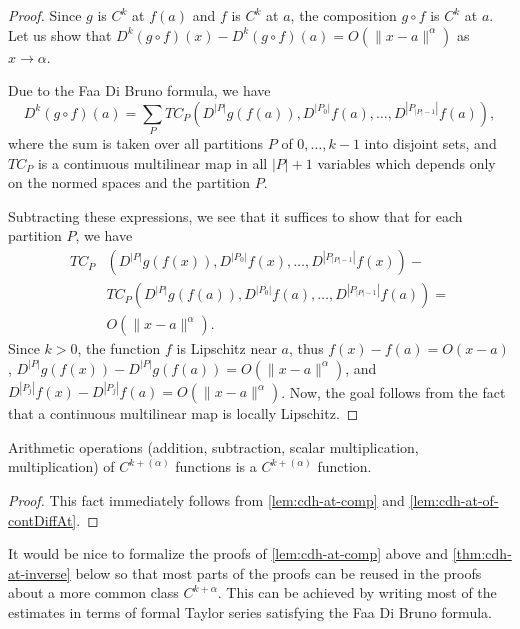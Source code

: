 \begin{proof}
  Since \(g\) is \(C^{k}\) at \(f(a)\) and \(f\) is \(C^{k}\) at \(a\),
  the composition \(g\circ f\) is \(C^{k}\) at \(a\).
  Let us show that \(D^{k}(g\circ f)(x) - D^{k}(g\circ f)(a) = O(\|x - a\|^{\alpha})\) as \(x\to \alpha\).

  Due to the Faa Di Bruno formula, we have
  \[
    D^k(g\circ f)(a) = \sum_{P}TC_{P}\left(D^{|P|}g(f(a)), D^{|P_{0}|}f(a), \dots, D^{\left|P_{|P|-1}\right|}f(a)\right),
  \]
  where the sum is taken over all partitions \(P\) of \(0, \dots, k - 1\) into disjoint sets,
  and \(TC_{P}\) is a continuous multilinear map in all \(|P|+1\) variables
  which depends only on the normed spaces and the partition \(P\).

  Subtracting these expressions, we see that it suffices to show that for each partition \(P\),
  we have
  \begin{align*}
    TC_{P}&\left(D^{|P|}g(f(x)), D^{|P_{0}|}f(x), \dots, D^{\left|P_{|P|-1}\right|}f(x)\right) -\\
          &TC_{P}\left(D^{|P|}g(f(a)), D^{|P_{0}|}f(a), \dots, D^{\left|P_{|P|-1}\right|}f(a)\right) =\\
          &O(\|x - a\|^{\alpha}).
  \end{align*}
  Since \(k > 0\), the function \(f\) is Lipschitz near \(a\),
  thus \(f(x) - f(a) = O(x - a)\), \(D^{|P|}g(f(x)) - D^{|P|}g(f(a)) = O(\|x - a\|^{\alpha})\), and \(D^{|P_{j}|}f(x) - D^{|P_{j}|}f(a) = O(\|x - a\|^{\alpha})\).
  Now, the goal follows from the fact that a continuous multilinear map is locally Lipschitz.
\end{proof}

\begin{corollary}%
  \label{cor:cdh-at-arith}
  Arithmetic operations (addition, subtraction, scalar multiplication, multiplication)
  of \(C^{k+(\alpha)}\) functions is a \(C^{k+(\alpha)}\) function.
\end{corollary}

\begin{proof}
  This fact immediately follows
  from \autoref{lem:cdh-at-comp} and \autoref{lem:cdh-at-of-contDiffAt}.
\end{proof}

\begin{remark}
  It would be nice to formalize the proofs of \autoref{lem:cdh-at-comp} above
  and \autoref{thm:cdh-at-inverse} below
  so that most parts of the proofs
  can be reused in the proofs about a more common class \(C^{k+\alpha}\).
  This can be achieved by writing most of the estimates
  in terms of formal Taylor series satisfying the Faa Di Bruno formula.
\end{remark}

